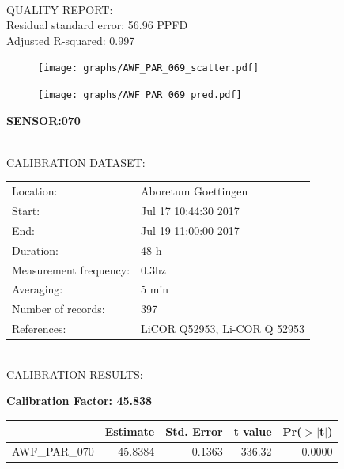 \documentclass[oneside]{report}
\begin{document}
\hrulefill\\
QUALITY REPORT:\\
Residual standard error: 56.96 PPFD\\
Adjusted R-squared: 0.997



\begin{figure}[H]
  \centering
  \texttt{[image: graphs/AWF\_PAR\_069\_scatter.pdf]}
\end{figure}




\begin{figure}[H]
  \centering
  \texttt{[image: graphs/AWF\_PAR\_069\_pred.pdf]}
\end{figure}

\pagebreak


\begin{center}
\large{\textbf{SENSOR:070}}\\
\end{center}

\hrulefill\\
CALIBRATION DATASET:\\
\begin{table}[h!]
  \centering
  \label{tab:table1}
  \begin{tabular}{ll}
    Location: & Aboretum Goettingen\\ 
    
    
    Start:  & Jul 17 10:44:30 2017 \\
    End:   & Jul 19 11:00:00 2017\\ 
    Duration: & 48 h\\
    Measurement frequency: & 0.3hz\\
    Averaging:  &5 min\\
    Number of records: & 397 \\
    References: & LiCOR Q52953, Li-COR Q 52953 \\
  \end{tabular}
\end{table}

\hrulefill\\
CALIBRATION RESULTS:\\


\begin{center}
\textbf{\large{Calibration Factor: 45.838}}\\
\end{center}
\begin{table}[ht]
\centering
\begin{tabular}{rrrrr}
  \hline
 & Estimate & Std. Error & t value & Pr($>$$|$t$|$) \\ 
  \hline
AWF\_PAR\_070 & 45.8384 & 0.1363 & 336.32 & 0.0000 \\ 
   \hline
\end{tabular}
\end{table}
\end{document}
